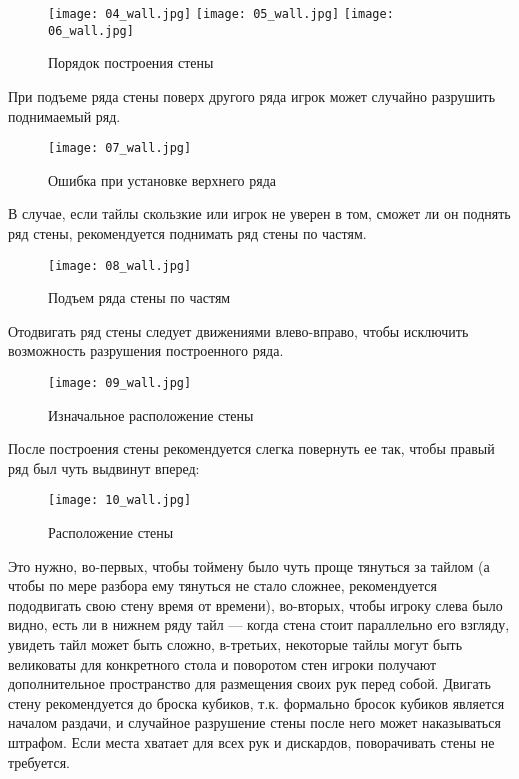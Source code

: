 \begin{figure}[H]
	\centering
	\texttt{[image: 04\_wall.jpg]}
	\texttt{[image: 05\_wall.jpg]}
	\texttt{[image: 06\_wall.jpg]}
	\caption{Порядок построения стены}
\end{figure}

При подъеме ряда стены поверх другого ряда игрок может случайно разрушить поднимаемый ряд. 

\begin{figure}[H]
	\centering
	\texttt{[image: 07\_wall.jpg]}
	\caption{Ошибка при установке верхнего ряда}
\end{figure}

\newpage

В случае, если тайлы скользкие или игрок не уверен в том, сможет ли он поднять ряд стены, рекомендуется поднимать ряд стены по частям.

\begin{figure}[H]
	\centering
	\texttt{[image: 08\_wall.jpg]}
	\caption{Подъем ряда стены по частям}
\end{figure}

Отодвигать ряд стены следует движениями влево-вправо, чтобы исключить возможность разрушения построенного ряда.

\begin{figure}[H]
	\centering
	\texttt{[image: 09\_wall.jpg]}
	\caption{Изначальное расположение стены}
\end{figure}

\newpage

После построения стены рекомендуется слегка повернуть ее так, чтобы правый ряд был чуть выдвинут вперед:

\begin{figure}[H]
	\centering
	\texttt{[image: 10\_wall.jpg]}
	\caption{Расположение стены}
\end{figure}

Это нужно, во-первых, чтобы тоймену было чуть проще тянуться за тайлом (а чтобы по мере разбора ему тянуться не стало сложнее, рекомендуется пододвигать свою стену время от времени), во-вторых, чтобы игроку слева было видно, есть ли в нижнем ряду тайл --- когда стена стоит параллельно его взгляду, увидеть тайл может быть сложно, в-третьих, некоторые тайлы могут быть великоваты для конкретного стола и поворотом стен игроки получают дополнительное пространство для размещения своих рук перед собой. Двигать стену рекомендуется до броска кубиков, т.к. формально бросок кубиков является началом раздачи, и случайное разрушение стены после него может наказываться штрафом. Если места хватает для всех рук и дискардов, поворачивать стены не требуется.

